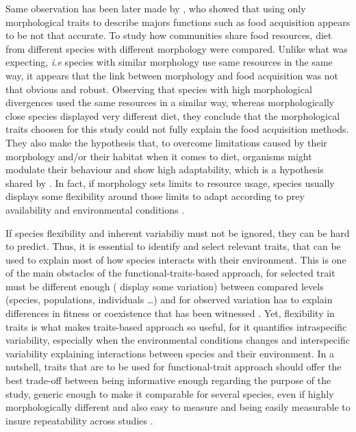 Same observation has been later made by \citep{grossman2009}, who showed that using only morphological traits to describe majors functions such as food acquisition appears to be not that accurate. To study how communities share food resources, diet from different species with different morphology were compared. Unlike what was expecting, \textit{i.e} species with similar morphology use same resources in the same way, it appears that the link between morphology and food acquisition was not that obvious and robust. Observing that species with high morphological divergences used the same resources in a similar way, whereas morphologically close species displayed very different diet, they conclude that the morphological traits choosen for this study could not fully explain the food acquisition methods. They also make the hypothesis that, to overcome limitations caused by their morphology and/or their habitat when it comes to diet, organisms might modulate their behaviour and show high adaptability, which is a hypothesis shared by \citep{blondel1979}. In fact, if morphology sets limits to resource usage, species usually displays some flexibility around those limits to adapt according to prey availability and environmental conditions \citep{ibanez2007,sibbing2000}. 

If species flexibility and inherent variabiliy must not be ignored, they can be hard to predict. Thus, it is essential to identify and select relevant traits, that can be used to explain most of how species interacts with their environment. This is one of the main obstacles of the functional-traits-based approach, for selected trait must be different enough ( display some variation) between compared levels (species, populations, individuals …) and for observed variation has to explain differences in fitness or coexistence that has been witnessed \citep{kremer2017}. Yet, flexibility in traits is what makes traits-based approach so useful, for it quantifies intraspecific variability, especially when the environmental conditions changes \citep{martini2020} and interspecific variability explaining interactions between species and their environment. In a nutshell, traits that are to be used for functional-trait approach should offer the best trade-off between being informative enough regarding the purpose of the study, generic enough to make it comparable for several species, even if highly morphologically different and also easy to measure and being easily measurable to insure repeatability across studies \citep{dumay2004, kremer2017}.

